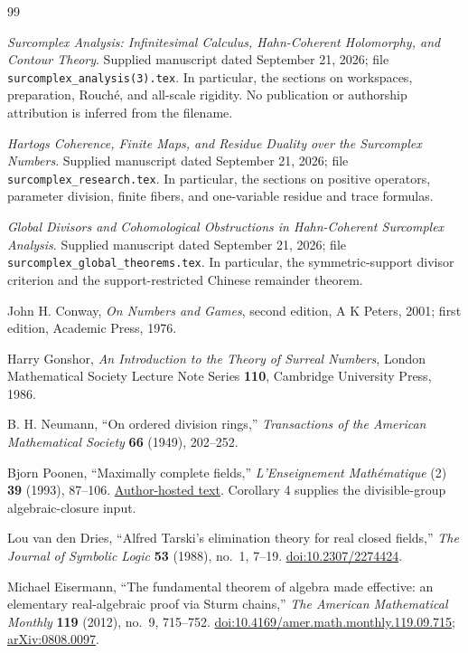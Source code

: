 \documentclass[11pt,letterpaper]{article}
\numberwithin{equation}{section}
\theoremstyle{definition}
\theoremstyle{remark}\newtheorem{remark}[theorem]{Remark}
\begin{document}
\begin{thebibliography}{99}
\small
{}
\emph{Surcomplex Analysis: Infinitesimal Calculus, Hahn-Coherent
Holomorphy, and Contour Theory}. Supplied manuscript dated September 21,
2026; file \texttt{surcomplex\_analysis(3).tex}. In particular, the
sections on workspaces, preparation, Rouch\'e, and all-scale rigidity.
No publication or authorship attribution is inferred from the filename.

\emph{Hartogs Coherence, Finite Maps, and Residue Duality over the
Surcomplex Numbers}. Supplied manuscript dated September 21, 2026;
file \texttt{surcomplex\_research.tex}. In particular, the sections on
positive operators, parameter division, finite fibers, and one-variable
residue and trace formulas.

\emph{Global Divisors and Cohomological Obstructions in Hahn-Coherent
Surcomplex Analysis}. Supplied manuscript dated September 21, 2026;
file \texttt{surcomplex\_global\_theorems.tex}. In particular, the
symmetric-support divisor criterion and the support-restricted Chinese
remainder theorem.

John H. Conway, \emph{On Numbers and Games}, second edition,
A K Peters, 2001; first edition, Academic Press, 1976.

Harry Gonshor, \emph{An Introduction to the Theory of Surreal Numbers},
London Mathematical Society Lecture Note Series \textbf{110},
Cambridge University Press, 1986.

B. H. Neumann, ``On ordered division rings,''
\emph{Transactions of the American Mathematical Society}
\textbf{66} (1949), 202--252.

Bjorn Poonen, ``Maximally complete fields,''
\emph{L'Enseignement Math\'ematique} (2) \textbf{39} (1993), 87--106.
\href{https://math.mit.edu/~poonen/papers/amsval.pdf}{Author-hosted text}.
Corollary 4 supplies the divisible-group algebraic-closure input.

Lou van den Dries, ``Alfred Tarski's elimination theory for real closed
fields,'' \emph{The Journal of Symbolic Logic} \textbf{53} (1988),
no.~1, 7--19.
\href{https://doi.org/10.2307/2274424}{doi:10.2307/2274424}.

Michael Eisermann, ``The fundamental theorem of algebra made effective:
an elementary real-algebraic proof via Sturm chains,''
\emph{The American Mathematical Monthly} \textbf{119} (2012), no.~9,
715--752.
\href{https://doi.org/10.4169/amer.math.monthly.119.09.715}{doi:10.4169/amer.math.monthly.119.09.715};
\href{https://arxiv.org/abs/0808.0097}{arXiv:0808.0097}.


\end{thebibliography}
\end{document}
